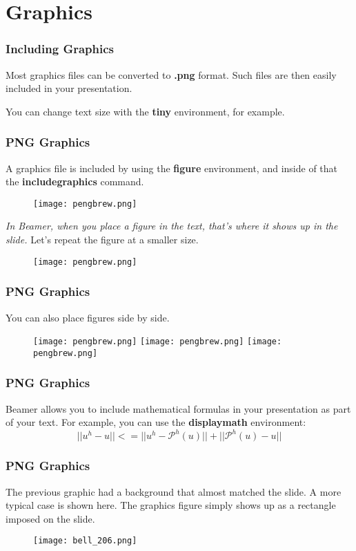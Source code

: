 \documentclass{beamer}
\begin{document}
  \section{Graphics}
  \frame
  {
    \frametitle{Including Graphics}

    Most graphics files can be converted to {\bf .png} format.
    Such files are then easily included in your presentation.
    
    \begin{tiny}
    You can change text size with the {\bf{tiny}} environment, for example.
    \end{tiny}
  }
  \frame
  {
    \frametitle{PNG Graphics}

    A graphics file is included by using the {\bf figure} environment,
    and inside of that the {\bf includegraphics} command.
    \begin{figure}
      \scalebox{0.30}
      {
        \texttt{[image: pengbrew.png]}
      }
    \end{figure}
    {\it{In Beamer, when you place a figure in the text, that's where it shows
    up in the slide.}}  Let's repeat the figure at a smaller size.
    \begin{figure}
      \scalebox{0.20}
      {
        \texttt{[image: pengbrew.png]}
      }
    \end{figure}
  }
  \frame
  {
    \frametitle{PNG Graphics}

    You can also place figures side by side.
    \begin{figure}
      \texttt{[image: pengbrew.png]}
      \texttt{[image: pengbrew.png]}
      \texttt{[image: pengbrew.png]}
    \end{figure}
  }
 \frame
  {
    \frametitle{PNG Graphics}

    Beamer allows you to include mathematical formulas in your presentation
    as part of your text.  For example, you can use the {\bf{displaymath}}
    environment:
    \begin{displaymath}
      || u^h - u || <= ||u^h - \mathcal{P}^h(u)|| + ||\mathcal{P}^h(u) - u||
    \end{displaymath}
  }
  \frame
  {
    \frametitle{PNG Graphics}

    The previous graphic had a background that almost matched the
    slide.  A more typical case is shown here.
    The graphics figure simply shows up as a rectangle imposed on
    the slide.
    \begin{figure}
      \scalebox{0.35}
      {
        \texttt{[image: bell\_206.png]}
      }
    \end{figure}
  }
\end{document}
